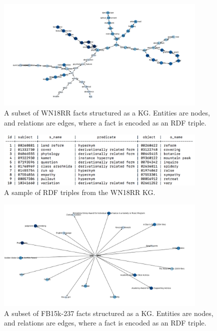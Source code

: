 \begin{figure}[H]
   	\centering
    	\includegraphics[width=0.9\textwidth, height=0.5\textwidth]{WN18RR_Graph}
	\captionsetup{justification=centering}
	\caption{A subset of WN18RR facts structured as a KG. Entities are nodes, and relations are edges, where a fact is encoded as an RDF triple.}
\end{figure}

\begin{figure}[H]
   	\centering
    	\includegraphics[width=0.9\textwidth, height=0.3\textwidth]{wn18rr_fact_sample}
	\captionsetup{justification=centering}
	\caption{A sample of RDF triples from the WN18RR KG.}
\end{figure}

\begin{figure}[H]
   	\centering
    	\includegraphics[width=0.9\textwidth, height=0.5\textwidth]{FB15k-237_Graph}
	\captionsetup{justification=centering}
	\caption{A subset of FB15k-237 facts structured as a KG. Entities are nodes, and relations are edges, where a fact is encoded as an RDF triple.}
\end{figure}

